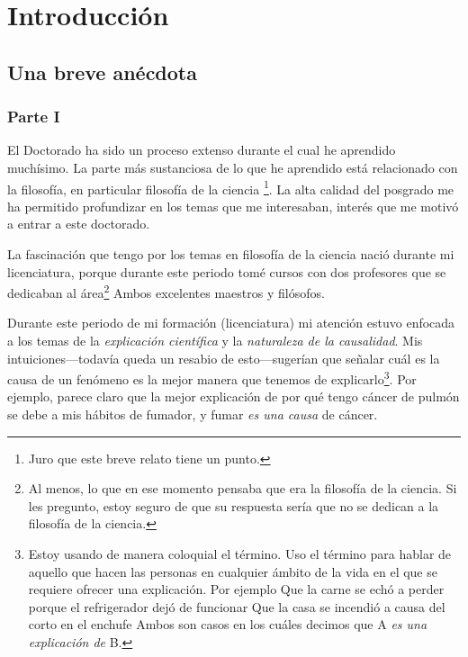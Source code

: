 
\chapter*{Introducción}\label{ch:introduction}

\section*{Una breve anécdota}

\subsection{Parte I}

\noindent El Doctorado ha sido un proceso extenso
durante el cual he aprendido muchísimo. La parte más
sustanciosa de lo que he aprendido está relacionado
con la filosofía, en particular filosofía de la ciencia
\footnote{
	Juro que este breve relato tiene un punto.
}.
La alta calidad del posgrado me ha permitido
profundizar en los temas que me interesaban, interés
que me motivó a entrar a este doctorado.

La fascinación que tengo por los temas en filosofía de
la ciencia nació durante mi licenciatura, porque
durante este periodo tomé cursos con dos profesores
que se dedicaban al área\footnote{
	Al menos, lo que en ese momento pensaba que era la
	filosofía de la	ciencia. Si les pregunto, estoy
	seguro de que su respuesta sería que no se dedican
	a la filosofía de la ciencia.
}
Ambos excelentes maestros y filósofos.

Durante este periodo de mi formación (licenciatura) mi
atención estuvo enfocada a los temas de la \emph{explicación científica}
y la \emph{naturaleza de la causalidad}. Mis intuiciones---todavía queda un
resabio de esto---sugerían que señalar cuál es la
causa de un fenómeno es la mejor manera que tenemos de
explicarlo\footnote{
	Estoy usando de manera coloquial el término. Uso
	el término para hablar de aquello que hacen las
	personas en cualquier ámbito de la vida en el que
	se requiere ofrecer una explicación. Por ejemplo
    Que la carne se echó a perder porque el	refrigerador dejó de funcionar
    Que la casa se incendió a causa del	corto en el enchufe
	Ambos son casos en los cuáles decimos que A \emph{es una
	explicación de} B.
}.
Por ejemplo, parece claro que la mejor explicación de
por qué tengo cáncer de pulmón se debe a mis hábitos
de fumador, y fumar \emph{es una causa} de cáncer.

